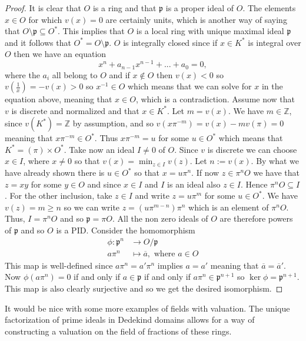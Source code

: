 \documentclass{article}
\newcommand{\mfrak}[1]{\mathfrak{#1}}
\newcommand{\mbb}[1]{\mathbb{#1}}
\numberwithin{equation}{section}
\begin{document}
\begin{proof}
    It is clear that $O$ is a ring and that $\mfrak p$ is a proper ideal of $O$. The elements $x \in O$ for which $v(x) = 0$ are certainly units, which is another way of saying that
    $O \setminus \mfrak p \subseteq  O^*$. This implies that $O$ is a local ring with unique maximal ideal $\mfrak p$ and it follows that $O^* = O \setminus \mfrak p$. $O$ is integrally closed since if $x \in K^*$ is integral over $O$ then we have an equation 
    $$x^n + a_{n-1}x^{n-1} + ... + a_0 = 0,$$ 
    where the $a_i$ all belong to $O$ and if $x \notin O$ then $v(x) < 0$ so $v(\frac{1}{x}) = -v(x) > 0$ so $x^{-1} \in O$ which means that we can solve for $x$ in the equation above, meaning that $x \in O$, which is a contradiction. 
    Assume now that $v$ is discrete and normalized and that $x \in K^*$. Let $m = v(x)$. We have $m \in \mbb Z$, since $v(K^*) = \mbb Z$ by assumption, and so $v(x \pi^{-m}) = v(x) - mv(\pi) = 0$ meaning that $x \pi^{-m} \in O^*$. Thus $x \pi^{-m} = u$ for some $u \in O^*$ which means that $K^* = (\pi) \times O^*$. Take now an ideal $I \neq 0$ of $O$. Since $v$ is discrete we can choose $x \in I$, where $x \neq 0$ so that $v(x) = \min_{z \in I}v(z)$. Let $n := v(x)$. By what we have already shown there is $u \in O^*$ so that $x = u\pi^n$. If now $z \in \pi^n O$ we have that $z = xy$ for some $y \in O$ and since $x \in I$ and $I$ is an ideal also $z \in I$. Hence $\pi^n O \subseteq I$. For the other inclusion, take $z \in I$ and write $z = u \pi^m$ for some $u \in O^*$. We have $v(z) = m \geq n$ so we can write $z = (u \pi^{m-n}) \pi^n$ which is an element of $\pi^n O$. Thus, $I = \pi^n O$ and so $\mfrak p = \pi O$. All the non zero ideals of $O$ are therefore powers of $\mfrak p$ and so $O$ is a PID. Consider the homomorphism
    \begin{align*}
        \phi : \mfrak p^n & \to O / \mfrak p                              \\
        a \pi^n           & \mapsto \overline a, \text{ where } a \in O
    \end{align*}
    This map is well-defined since $a \pi^n = a' \pi^n$ implies $a = a'$ meaning that $\overline a = \overline a'$. Now $\phi(a \pi^n) = 0$ if and only if $a \in \mfrak p$ if and only if $a \pi^n \in \mfrak p^{n+1}$ so $\ker \phi = \mfrak p^{n+1}$. This map is also clearly surjective and so we get the desired isomorphism.
\end{proof}

It would be nice with some more examples of fields with valuation. The unique factorization of prime ideals in Dedekind domains allows for a way of constructing a valuation on the field of fractions of these rings. 
\end{document}
